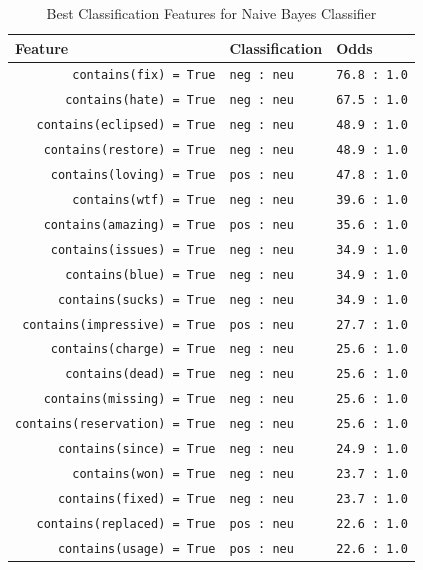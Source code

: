 \begin{table}[h]
\centering
\begin{tabular}{|l|l|l|}
\hline
Feature & Classification & Odds \\
\hline
\verb'        contains(fix) = True' & \verb'neg : neu' & \verb'76.8 : 1.0' \\
\verb'       contains(hate) = True' & \verb'neg : neu' & \verb'67.5 : 1.0' \\
\verb'   contains(eclipsed) = True' & \verb'neg : neu' & \verb'48.9 : 1.0' \\
\verb'    contains(restore) = True' & \verb'neg : neu' & \verb'48.9 : 1.0' \\
\verb'     contains(loving) = True' & \verb'pos : neu' & \verb'47.8 : 1.0' \\
\verb'        contains(wtf) = True' & \verb'neg : neu' & \verb'39.6 : 1.0' \\
\verb'    contains(amazing) = True' & \verb'pos : neu' & \verb'35.6 : 1.0' \\
\verb'     contains(issues) = True' & \verb'neg : neu' & \verb'34.9 : 1.0' \\
\verb'       contains(blue) = True' & \verb'neg : neu' & \verb'34.9 : 1.0' \\
\verb'      contains(sucks) = True' & \verb'neg : neu' & \verb'34.9 : 1.0' \\
\verb' contains(impressive) = True' & \verb'pos : neu' & \verb'27.7 : 1.0' \\
\verb'     contains(charge) = True' & \verb'neg : neu' & \verb'25.6 : 1.0' \\
\verb'       contains(dead) = True' & \verb'neg : neu' & \verb'25.6 : 1.0' \\
\verb'    contains(missing) = True' & \verb'neg : neu' & \verb'25.6 : 1.0' \\
\verb'contains(reservation) = True' & \verb'neg : neu' & \verb'25.6 : 1.0' \\
\verb'      contains(since) = True' & \verb'neg : neu' & \verb'24.9 : 1.0' \\
\verb'        contains(won) = True' & \verb'neg : neu' & \verb'23.7 : 1.0' \\
\verb'      contains(fixed) = True' & \verb'neg : neu' & \verb'23.7 : 1.0' \\
\verb'   contains(replaced) = True' & \verb'pos : neu' & \verb'22.6 : 1.0' \\
\verb'      contains(usage) = True' & \verb'pos : neu' & \verb'22.6 : 1.0' \\
\hline
\end{tabular}
\caption{Best Classification Features for Naive Bayes Classifier}
\label{table:naive_features}
\end{table}




